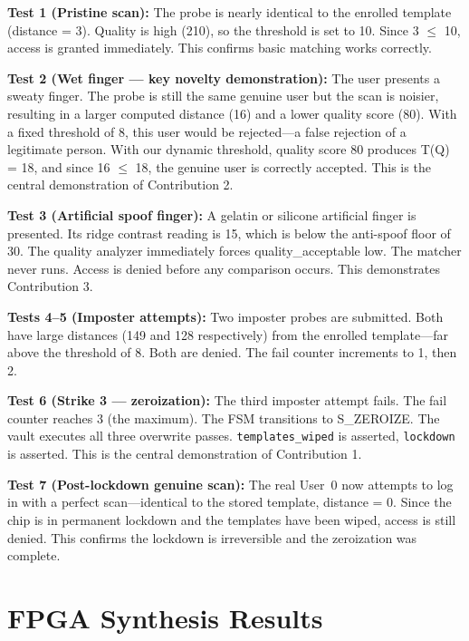 \documentclass[conference]{IEEEtran}
\begin{document}
\textbf{Test 1 (Pristine scan):} The probe is nearly identical to
the enrolled template (distance = 3). Quality is high (210), so the
threshold is set to 10. Since 3 $\leq$ 10, access is granted
immediately. This confirms basic matching works correctly.

\textbf{Test 2 (Wet finger --- key novelty demonstration):} The user
presents a sweaty finger. The probe is still the same genuine user but
the scan is noisier, resulting in a larger computed distance (16) and
a lower quality score (80). With a fixed threshold of 8, this user
would be rejected---a false rejection of a legitimate person. With our
dynamic threshold, quality score 80 produces T(Q) = 18, and since
16 $\leq$ 18, the genuine user is correctly accepted. This is the
central demonstration of Contribution 2.

\textbf{Test 3 (Artificial spoof finger):} A gelatin or silicone
artificial finger is presented. Its ridge contrast reading is 15,
which is below the anti-spoof floor of 30. The quality analyzer
immediately forces quality\_acceptable low. The matcher never runs.
Access is denied before any comparison occurs. This demonstrates
Contribution 3.

\textbf{Tests 4--5 (Imposter attempts):} Two imposter probes are
submitted. Both have large distances (149 and 128 respectively) from
the enrolled template---far above the threshold of 8. Both are denied.
The fail counter increments to 1, then 2.

\textbf{Test 6 (Strike 3 --- zeroization):} The third imposter attempt
fails. The fail counter reaches 3 (the maximum). The FSM transitions
to S\_ZEROIZE. The vault executes all three overwrite passes.
\texttt{templates\_wiped} is asserted, \texttt{lockdown} is asserted.
This is the central demonstration of Contribution 1.

\textbf{Test 7 (Post-lockdown genuine scan):} The real User~0 now
attempts to log in with a perfect scan---identical to the stored
template, distance = 0. Since the chip is in permanent lockdown and
the templates have been wiped, access is still denied. This confirms
the lockdown is irreversible and the zeroization was complete.

\section{FPGA Synthesis Results}
\end{document}
